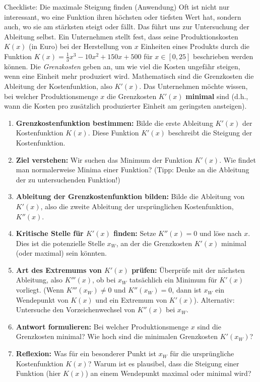 \begin{aufgabenumgebung}{Checkliste: Die maximale Steigung finden (Anwendung)}
Oft ist nicht nur interessant, wo eine Funktion ihren höchsten oder tiefsten Wert hat, sondern auch, wo sie am stärksten steigt oder fällt. Das führt uns zur Untersuchung der Ableitung selbst.
Ein Unternehmen stellt fest, dass seine Produktionskosten $K(x)$ (in Euro) bei der Herstellung von $x$ Einheiten eines Produkts durch die Funktion $K(x) = \frac{1}{3}x^3 - 10x^2 + 150x + 500$ für $x \in [0, 25]$ beschrieben werden können.
Die \textit{Grenzkosten} geben an, um wie viel die Kosten ungefähr steigen, wenn eine Einheit mehr produziert wird. Mathematisch sind die Grenzkosten die Ableitung der Kostenfunktion, also $K'(x)$.
Das Unternehmen möchte wissen, bei welcher Produktionsmenge $x$ die Grenzkosten $K'(x)$ \textbf{minimal} sind (d.h., wann die Kosten pro zusätzlich produzierter Einheit am geringsten ansteigen).

\begin{enumerate}[label=(\alph*)]
    \item \textbf{Grenzkostenfunktion bestimmen:} Bilde die erste Ableitung $K'(x)$ der Kostenfunktion $K(x)$. Diese Funktion $K'(x)$ beschreibt die Steigung der Kostenfunktion.
    \item \textbf{Ziel verstehen:} Wir suchen das Minimum der Funktion $K'(x)$. Wie findet man normalerweise Minima einer Funktion? (Tipp: Denke an die Ableitung der zu untersuchenden Funktion!)
    \item \textbf{Ableitung der Grenzkostenfunktion bilden:} Bilde die Ableitung von $K'(x)$, also die zweite Ableitung der ursprünglichen Kostenfunktion, $K''(x)$.
    \item \textbf{Kritische Stelle für $K'(x)$ finden:} Setze $K''(x) = 0$ und löse nach $x$. Dies ist die potenzielle Stelle $x_W$, an der die Grenzkosten $K'(x)$ minimal (oder maximal) sein könnten.
    \item \textbf{Art des Extremums von $K'(x)$ prüfen:} Überprüfe mit der nächsten Ableitung, also $K'''(x)$, ob bei $x_W$ tatsächlich ein Minimum für $K'(x)$ vorliegt. (Wenn $K'''(x_W) \neq 0$ und $K''(x_W)=0$, dann ist $x_W$ ein Wendepunkt von $K(x)$ und ein Extremum von $K'(x)$). Alternativ: Untersuche den Vorzeichenwechsel von $K''(x)$ bei $x_W$.
    \item \textbf{Antwort formulieren:} Bei welcher Produktionsmenge $x$ sind die Grenzkosten minimal? Wie hoch sind die minimalen Grenzkosten $K'(x_W)$?
    \item \textbf{Reflexion:} Was für ein besonderer Punkt ist $x_W$ für die ursprüngliche Kostenfunktion $K(x)$? Warum ist es plausibel, dass die Steigung einer Funktion (hier $K(x)$) an einem Wendepunkt maximal oder minimal wird?
\end{enumerate}
\end{aufgabenumgebung}

